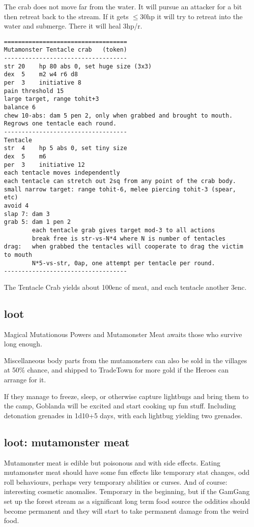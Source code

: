 \begin{description}
The crab does not move far from the water. It will pursue an attacker for a bit then retreat back to the stream. If it gets $\leq$30hp it will try to retreat into the water and submerge. There it will heal 3hp/r.
\goodbreak \begin{samepage} \small \begin{verbatim}
===================================
Mutamonster Tentacle crab   (token)
-----------------------------------
str 20    hp 80 abs 0, set huge size (3x3)
dex  5    m2 w4 r6 d8
per  3    initiative 8
pain threshold 15
large target, range tohit+3
balance 6
chew 10-abs: dam 5 pen 2, only when grabbed and brought to mouth.
Regrows one tentacle each round.
-----------------------------------
Tentacle
str  4    hp 5 abs 0, set tiny size
dex  5    m6
per  3    initiative 12
each tentacle moves independently
each tentacle can stretch out 2sq from any point of the crab body.
small narrow target: range tohit-6, melee piercing tohit-3 (spear, etc)
avoid 4
slap 7: dam 3
grab 5: dam 1 pen 2
        each tentacle grab gives target mod-3 to all actions
        break free is str-vs-N*4 where N is number of tentacles
drag:   when grabbed the tentacles will cooperate to drag the victim to mouth
        N*5-vs-str, 0ap, one attempt per tentacle per round.
-----------------------------------
\end{verbatim} \normalsize \end{samepage}
The Tentacle Crab yields about 100enc of meat, and each tentacle another 3enc.

\end{description}
\flushbottom


\subsection*{loot}
Magical Mutationous Powers and Mutamonster Meat awaits those who survive long enough.

Miscellaneous body parts from the mutamonsters can also be sold in the villages at 50\% chance, and shipped to TradeTown for more gold if the Heroes can arrange for it.

If they manage to freeze, sleep, or otherwise capture lightbugs and bring them to the camp, Goblanda will be excited and start cooking up fun stuff. Including detonation grenades in 1d10+5 days, with each lightbug yielding two grenades.


\subsection*{loot: mutamonster meat}
Mutamonster meat is edible but poisonous and with side effects. Eating mutamonster meat should have some fun effects like temporary stat changes, odd roll behaviours, perhaps very temporary abilities or curses. And of course: interesting cosmetic anomalies. Temporary in the beginning, but if the GamGang set up the forest stream as a significant long term food source the oddities should become permanent and they will start to take permanent damage from the weird food.

